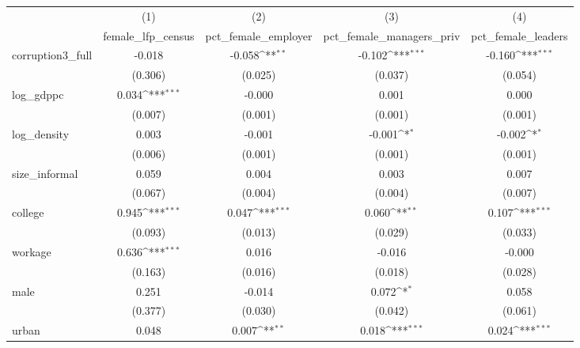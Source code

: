 {
\def\sym#1{\ifmmode^{#1}\else\(^{#1}\)\fi}
\begin{tabular}{l*{4}{c}}
\hline\hline
            &\multicolumn{1}{c}{(1)}&\multicolumn{1}{c}{(2)}&\multicolumn{1}{c}{(3)}&\multicolumn{1}{c}{(4)}\\
            &\multicolumn{1}{c}{female\_lfp\_census}&\multicolumn{1}{c}{pct\_female\_employer}&\multicolumn{1}{c}{pct\_female\_managers\_priv}&\multicolumn{1}{c}{pct\_female\_leaders}\\
\hline
corruption3\_full&      -0.018         &      -0.058\sym{**} &      -0.102\sym{***}&      -0.160\sym{***}\\
            &     (0.306)         &     (0.025)         &     (0.037)         &     (0.054)         \\
[1em]
log\_gdppc   &       0.034\sym{***}&      -0.000         &       0.001         &       0.000         \\
            &     (0.007)         &     (0.001)         &     (0.001)         &     (0.001)         \\
[1em]
log\_density &       0.003         &      -0.001         &      -0.001\sym{*}  &      -0.002\sym{*}  \\
            &     (0.006)         &     (0.001)         &     (0.001)         &     (0.001)         \\
[1em]
size\_informal&       0.059         &       0.004         &       0.003         &       0.007         \\
            &     (0.067)         &     (0.004)         &     (0.004)         &     (0.007)         \\
[1em]
college     &       0.945\sym{***}&       0.047\sym{***}&       0.060\sym{**} &       0.107\sym{***}\\
            &     (0.093)         &     (0.013)         &     (0.029)         &     (0.033)         \\
[1em]
workage     &       0.636\sym{***}&       0.016         &      -0.016         &      -0.000         \\
            &     (0.163)         &     (0.016)         &     (0.018)         &     (0.028)         \\
[1em]
male        &       0.251         &      -0.014         &       0.072\sym{*}  &       0.058         \\
            &     (0.377)         &     (0.030)         &     (0.042)         &     (0.061)         \\
[1em]
urban       &       0.048         &       0.007\sym{**} &       0.018\sym{***}&       0.024\sym{***}\\

\end{tabular}}
